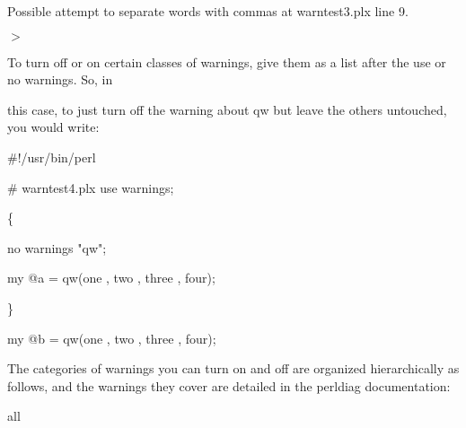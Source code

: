 \documentclass[a4paper,11pt]{book}
\begin{document}
\noindent Possible attempt to separate words with commas at warntest3.plx line 9.

\noindent $>$

\noindent 

\noindent 

\noindent To turn off or on certain classes of warnings, give them as a list after the use or no warnings. So, in

\noindent this case, to just turn off the warning about qw but leave the others untouched, you would write:

\noindent 

\noindent 

\noindent \#!/usr/bin/perl

\noindent \# warntest4.plx use warnings;

\noindent 

\noindent \{

\noindent no warnings "qw";

\noindent my @a = qw(one , two , three , four);

\noindent \}

\noindent my @b = qw(one , two , three , four);

\noindent 

\noindent The categories of warnings you can turn on and off are organized hierarchically as follows, and the warnings they cover are detailed in the perldiag documentation:

\noindent 

\noindent 

\noindent all

\noindent 

\noindent 
\end{document}
